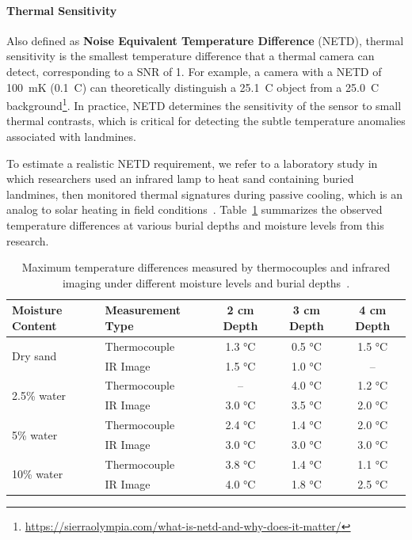 \paragraph{Thermal Sensitivity}

Also defined as \textbf{Noise Equivalent Temperature Difference} (NETD), thermal sensitivity is the smallest temperature difference that a thermal camera can detect, corresponding to a \gls{SNR} of 1. For example, a camera with a \gls{NETD} of 100~mK (0.1~\textdegree C) can theoretically distinguish a 25.1~\textdegree C object from a 25.0~\textdegree C background\footnote{\url{https://sierraolympia.com/what-is-netd-and-why-does-it-matter/}}. In practice, \gls{NETD} determines the sensitivity of the sensor to small thermal contrasts, which is critical for detecting the subtle temperature anomalies associated with landmines.

To estimate a realistic \gls{NETD} requirement, we refer to a laboratory study in which researchers used an infrared lamp to heat sand containing buried landmines, then monitored thermal signatures during passive cooling, which is an analog to solar heating in field conditions~\cite{lamorski2002thermal}. Table~\ref{tab:netd_table} summarizes the observed temperature differences at various burial depths and moisture levels from this research.


\begin{table}[H]
    \centering
    \footnotesize
    \renewcommand{\arraystretch}{1}
    \setlength{\tabcolsep}{6pt}
    \caption[Maximum temperature differences across moisture levels and depths]{Maximum temperature differences measured by thermocouples and infrared imaging under different moisture levels and burial depths~\cite{lamorski2002thermal}.}
    \label{tab:netd_table}
    \begin{tabular}{llccc}
        \toprule
        \textbf{Moisture Content} & \textbf{Measurement Type} & \textbf{2 cm Depth} & \textbf{3 cm Depth} & \textbf{4 cm Depth} \\
        \midrule
        \multirow{2}{*}{Dry sand} 
            & Thermocouple & 1.3 °C & 0.5 °C & 1.5 °C \\
            & IR Image     & 1.5 °C & 1.0 °C & -- \\
        \midrule
        \multirow{2}{*}{2.5\% water} 
            & Thermocouple & --     & 4.0 °C & 1.2 °C \\
            & IR Image     & 3.0 °C & 3.5 °C & 2.0 °C \\
        \midrule
        \multirow{2}{*}{5\% water} 
            & Thermocouple & 2.4 °C & 1.4 °C & 2.0 °C \\
            & IR Image     & 3.0 °C & 3.0 °C & 3.0 °C \\
        \midrule
        \multirow{2}{*}{10\% water} 
            & Thermocouple & 3.8 °C & 1.4 °C & 1.1 °C \\
            & IR Image     & 4.0 °C & 1.8 °C & 2.5 °C \\
        \bottomrule
    \end{tabular}
\end{table}


